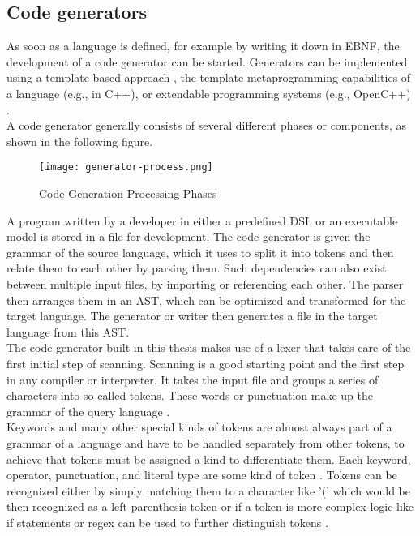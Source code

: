 \subsection{Code generators}
As soon as a language is defined, for example by writing it down in \ac{EBNF}, the development of a code generator can be started. Generators can be implemented using a template-based approach \parencite[see][]{cleaveland_program_2001}, the template metaprogramming capabilities of a language (e.g., in C++), or extendable programming systems (e.g., OpenC++) \parencite[cf.][p. 16]{czarnecki_generative_2000}.\\
A code generator generally consists of several different phases or components, as shown in the following figure.
\begin{figure}[H]
    \caption{Code Generation Processing Phases}
    \label{fig:generator-process}
    \texttt{[image: generator-process.png]}
    \\
    \cite[Source: Based on][p. 5]{sarkar_code_2001}
\end{figure}
A program written by a developer in either a predefined \ac{DSL} or an executable model is stored in a file for development. The code generator is given the grammar of the source language, which it uses to split it into tokens and then relate them to each other by parsing them. Such dependencies can also exist between multiple input files, by importing or referencing each other. The parser then arranges them in an \ac{AST}, which can be optimized and transformed for the target language. The generator or writer then generates a file in the target language from this \ac{AST}.\\
The code generator built in this thesis makes use of a lexer that takes care of the first initial step of scanning. Scanning is a good starting point and the first step in any compiler or interpreter. It takes the input file and groups a series of characters into so-called tokens. These words or punctuation make up the grammar of the query language \parencite[cf.][p. 39]{nystrom_crafting_2021}.\\
Keywords and many other special kinds of tokens are almost always part of a grammar of a language and have to be handled separately from other tokens, to achieve that tokens must be assigned a kind to differentiate them. Each keyword, operator, punctuation, and literal type are some kind of token \parencite[cf.][p. 43]{nystrom_crafting_2021}. Tokens can be recognized either by simply matching them to a character like '(' which would be then recognized as a left parenthesis token or if a token is more complex logic like if statements or regex can be used to further distinguish tokens \parencite[see][pp. 47-54]{nystrom_crafting_2021}.\\
